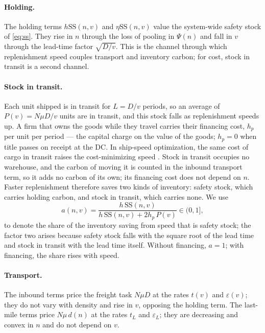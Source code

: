 \documentclass[11pt]{article}
\numberwithin{proposition}{section}
\theoremstyle{definition}
\theoremstyle{remark}
\theoremstyle{plain}
\newcommand{\sstock}{\mathrm{SS}}
\begin{document}
\paragraph{Holding.} The holding terms $h\sstock(n,v)$ and $\eta\sstock(n,v)$ value the system-wide safety
stock of \eqref{eq:ss}. They rise in $n$ through the loss of pooling in $\Psi(n)$ and fall in $v$ through the
lead-time factor $\sqrt{D/v}$. This is the channel through which replenishment speed couples transport and
inventory carbon; for cost, stock in transit is a second channel.

\paragraph{Stock in transit.} Each unit shipped is in transit for $L=D/v$ periods, so an average of
$P(v)=N\mu D/v$ units are in transit, and this stock falls as replenishment speeds up. A firm that owns the goods
while they travel carries their financing cost, $h_p$ per unit per period --- the capital charge on the value of
the goods; $h_p=0$ when title passes on receipt at the DC. In ship-speed optimization, the same cost
of cargo in transit raises the cost-minimizing speed \citep{psaraftis2014ship}. Stock in transit occupies no
warehouse, and the carbon of moving it is counted in the inbound transport term, so it adds no carbon of its own;
its financing cost does not depend on $n$. Faster replenishment therefore saves two kinds of inventory: safety
stock, which carries holding carbon, and stock in transit, which carries none. We use
\begin{equation}\label{eq:stockshare}
  a(n,v)=\frac{h\,\sstock(n,v)}{h\,\sstock(n,v)+2h_p\,P(v)}\in(0,1],
\end{equation}
to denote the share of the inventory saving from speed that is safety stock; the factor two arises because
safety stock falls with the square root of the lead time and stock in transit with the lead time itself. Without
financing, $a=1$; with financing, the share rises with speed.

\paragraph{Transport.} The inbound terms price the freight task $N\mu D$ at the rates $t(v)$ and
$\varepsilon(v)$; they do not vary with density and rise in $v$, opposing the holding term. The last-mile terms
price $N\mu\,d(n)$ at the rates $t_L$ and $\varepsilon_L$; they are decreasing and convex in $n$ and do not
depend on $v$.
\end{document}
